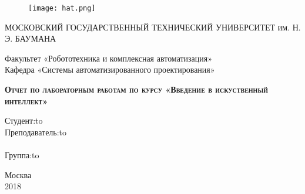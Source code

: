 \begin{titlepage}
\newpage

\begin{figure}[!htb]
\centering
\texttt{[image: hat.png]}
\end{figure}

\begin{center}
МОСКОВСКИЙ ГОСУДАРСТВЕННЫЙ ТЕХНИЧЕСКИЙ
УНИВЕРСИТЕТ им. Н. Э. БАУМАНА \\
\end{center}

\vspace{8em}

\begin{center}
\Large Факультет «Робототехника и комплексная автоматизация» \\
\Large Кафедра «Системы автоматизированного проектирования» \\ 
\end{center}

\vspace{2em}

\begin{center}
\textsc{\textbf{Отчет по лабораторным работам по курсу
 \linebreak «Введение в искуственный интеллект»}}
\end{center}

\vspace{6em}



\newbox{\lbox}
\newlength{\maxl}
\setlength{\maxl}{\wd\lbox}
\hfill\parbox{11cm}{
\hspace*{5cm}\hspace*{-5cm}Студент:\hfill\hbox to\\
\hspace*{5cm}\hspace*{-5cm}Преподаватель:\hfill\hbox to\\
\\
\hspace*{5cm}\hspace*{-5cm}Группа:\hfill\hbox to\\
}


\vspace{\fill}

\begin{center}
Москва \\2018
\end{center}

\end{titlepage}
